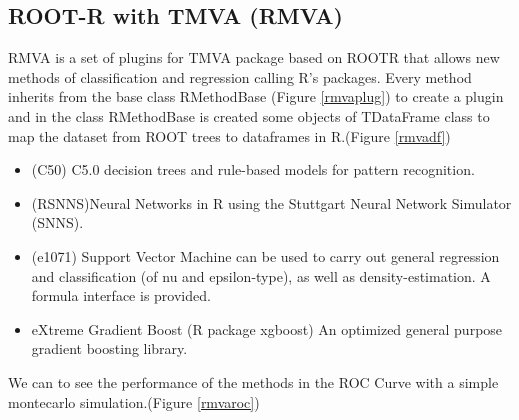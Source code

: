 \documentclass[a4paper]{jpconf}
\begin{document}
\subsection{ROOT-R with TMVA (RMVA)}\label{RMVA}
RMVA is a set of plugins for TMVA package based on ROOTR
that allows new methods of classification and regression calling
R's packages.
Every method inherits from the base class RMethodBase (Figure \ref{rmvaplug})
to create a plugin and in the class RMethodBase is created some objects of TDataFrame class to map
the dataset from ROOT trees to dataframes in R.(Figure \ref{rmvadf}) 
\begin{itemize}  
\item (C50) C5.0 decision trees and rule-based models for pattern
recognition\cite{c50}.
\item (RSNNS)Neural Networks in R using the Stuttgart Neural
Network Simulator (SNNS)\cite{rsnns}.
\item (e1071) Support Vector Machine can be used to carry out
general regression and classification (of nu and epsilon-type),
as well as density-estimation. A formula interface is provided\cite{e1071}.
\item eXtreme Gradient Boost (R package xgboost) An optimized
general purpose gradient boosting library\cite{chen2015xgboost}.
\end{itemize}

We can to see the performance of the methods in the ROC Curve with a simple montecarlo simulation.(Figure \ref{rmvaroc})
\end{document}
